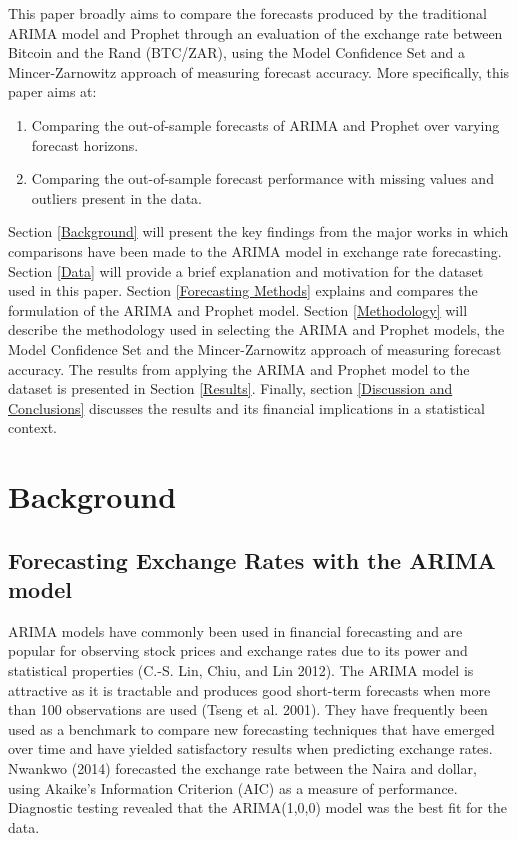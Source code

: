 \documentclass[12pt,a4paper]{article}
\numberwithin{equation}{section}
\numberwithin{figure}{section}
\numberwithin{table}{section}
\begin{document}
This paper broadly aims to compare the forecasts produced by the
traditional ARIMA model and Prophet through an evaluation of the
exchange rate between Bitcoin and the Rand (BTC/ZAR), using the Model
Confidence Set and a Mincer-Zarnowitz approach of measuring forecast
accuracy. More specifically, this paper aims at:

\begin{enumerate}
\def\labelenumi{\arabic{enumi}.}
\item
  Comparing the out-of-sample forecasts of ARIMA and Prophet over
  varying forecast horizons.
\item
  Comparing the out-of-sample forecast performance with missing values
  and outliers present in the data.
\end{enumerate}

Section \ref{Background} will present the key findings from the major
works in which comparisons have been made to the ARIMA model in exchange
rate forecasting. Section \ref{Data} will provide a brief explanation
and motivation for the dataset used in this paper. Section
\ref{Forecasting Methods} explains and compares the formulation of the
ARIMA and Prophet model. Section \ref{Methodology} will describe the
methodology used in selecting the ARIMA and Prophet models, the Model
Confidence Set and the Mincer-Zarnowitz approach of measuring forecast
accuracy. The results from applying the ARIMA and Prophet model to the
dataset is presented in Section \ref{Results}. Finally, section
\ref{Discussion and Conclusions} discusses the results and its financial
implications in a statistical context.

\section{\texorpdfstring{Background
\label{Background}}{Background }}\label{background}

\subsection{Forecasting Exchange Rates with the ARIMA
model}\label{forecasting-exchange-rates-with-the-arima-model}

ARIMA models have commonly been used in financial forecasting and are
popular for observing stock prices and exchange rates due to its power
and statistical properties (C.-S. Lin, Chiu, and Lin 2012). The ARIMA
model is attractive as it is tractable and produces good short-term
forecasts when more than 100 observations are used (Tseng et al. 2001).
They have frequently been used as a benchmark to compare new forecasting
techniques that have emerged over time and have yielded satisfactory
results when predicting exchange rates. Nwankwo (2014) forecasted the
exchange rate between the Naira and dollar, using Akaike's Information
Criterion (AIC) as a measure of performance. Diagnostic testing revealed
that the ARIMA(1,0,0) model was the best fit for the data.
\end{document}
